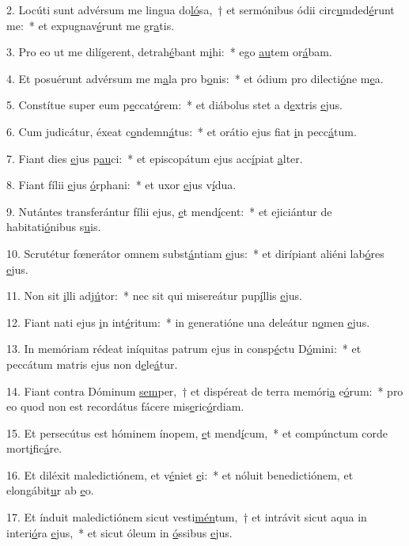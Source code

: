 2. Locúti sunt advérsum me lingua do\uline{ló}sa,~† et sermónibus ódii circ\uline{u}mded\uline{é}runt me:~* et expugnav\uline{é}runt me gr\uline{a}tis.\par 
3. Pro eo ut me dilígerent, detrah\uline{é}bant m\uline{i}hi:~* ego \uline{au}tem or\uline{á}bam.\par 
4. Et posuérunt advérsum me m\uline{a}la pro b\uline{o}nis:~* et ódium pro dilecti\uline{ó}ne m\uline{e}a.\par 
5. Constítue super eum p\uline{e}ccat\uline{ó}rem:~* et diábolus stet a d\uline{e}xtris \uline{e}jus.\par 
6. Cum judicátur, éxeat c\uline{o}ndemn\uline{á}tus:~* et orátio ejus fiat \uline{i}n pecc\uline{á}tum.\par 
7. Fiant dies \uline{e}jus p\uline{au}ci:~* et episcopátum ejus acc\uline{í}piat \uline{a}lter.\par 
8. Fiant fílii \uline{e}jus \uline{ó}rphani:~* et uxor \uline{e}jus v\uline{í}dua.\par 
9. Nutántes transferántur fílii ejus, \uline{e}t mend\uline{í}cent:~* et ejiciántur de habitati\uline{ó}nibus s\uline{u}is.\par 
10. Scrutétur fœnerátor omnem subst\uline{á}ntiam \uline{e}jus:~* et dirípiant aliéni lab\uline{ó}res \uline{e}jus.\par 
11. Non sit \uline{i}lli adj\uline{ú}tor:~* nec sit qui misereátur pup\uline{í}llis \uline{e}jus.\par 
12. Fiant nati ejus \uline{i}n int\uline{é}ritum:~* in generatióne una deleátur n\uline{o}men \uline{e}jus.\par 
13. In memóriam rédeat iníquitas patrum ejus in consp\uline{é}ctu D\uline{ó}mini:~* et peccátum matris ejus non d\uline{e}le\uline{á}tur.\par 
14. Fiant contra Dóminum \uline{sem}per,~† et dispéreat de terra memóri\uline{a} e\uline{ó}rum:~* pro eo quod non est recordátus fácere mis\uline{e}ric\uline{ó}rdiam.\par 
15. Et persecútus est hóminem ínopem, \uline{e}t mend\uline{í}cum,~* et compúnctum corde mort\uline{i}fic\uline{á}re.\par 
16. Et diléxit maledictiónem, et v\uline{é}niet \uline{e}i:~* et nóluit benedictiónem, et elongábit\uline{u}r ab \uline{e}o.\par 
17. Et índuit maledictiónem sicut vesti\uline{mén}tum,~† et intrávit sicut aqua in interi\uline{ó}ra \uline{e}jus,~* et sicut óleum in \uline{ó}ssibus \uline{e}jus.\par 
